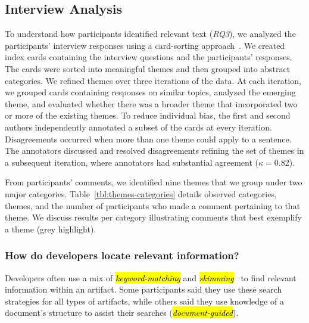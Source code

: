 
\subsection{Interview Analysis}

To understand how participants identified relevant text (\textit{RQ3}), we analyzed the participants'
interview responses using a card-sorting approach~\cite{spencer2009sorting}.
We created index cards containing the interview questions and the participants' responses.
The cards were sorted into meaningful themes and then grouped into abstract categories.
We refined themes over three iterations of the data.
At each  iteration, we grouped cards containing responses on similar topics, analyzed the emerging theme, and evaluated
whether there was a broader theme that incorporated two or more of the existing themes.
To reduce individual bias, the first and second authors independently annotated a subset of the cards at every iteration.
Disagreements occurred when more than one theme could apply to a sentence.
The annotators discussed and resolved disagreements refining the set of themes in a subsequent iteration, where annotators had substantial agreement ($\kappa=0.82$).





From participants' comments, we identified nine themes that we group under two major categories.
Table~\ref{tbl:themes-categories} details observed categories, themes, and the number of participants who made a comment pertaining to that theme.
We discuss results per category illustrating comments that best exemplify a theme (grey highlight).











\subsubsection{How do developers locate relevant information?}
\label{cp3:search-strategies}

Developers often use a mix of \hl{\textit{keyword-matching}} and \hl{\textit{skimming}}~\cite{Starke2009, Ko2006a} to find relevant information within an artifact. 
Some participants said they use these search strategies for all types of artifacts, while others said they use knowledge of a document's structure to assist their searches (\hl{\textit{document-guided}}).


